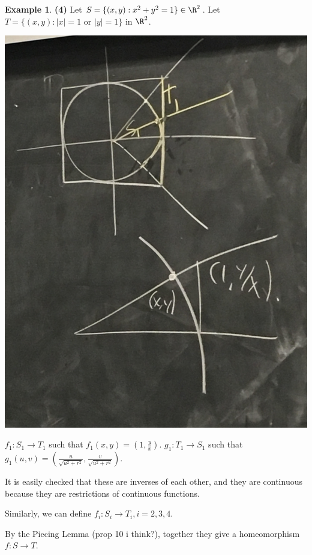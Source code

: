 \documentclass[a5paper]{article}
\theoremstyle{definition}%
\newtheorem*{example*}{Example}
\numberwithin{exercise}{section}
\theoremstyle{remark}%
\begin{document}
\begin{example*}\textbf{(4)}
Let $S=\{(x,y):x^2+y^2=1\}\in\R^2$. Let $T=\{(x,y):|x|=1\text{ or } |y|=1\}$ in $\R^2$. 

\begin{center}
\includegraphics[scale=.04]{images/s_t_figs}
\end{center}

$f_1:S_1\to T_1$ such that $f_1(x,y)=(1,\frac{y}{x})$. 
$g_1:T_1\to S_1$ such that $g_1(u,v)=(\frac{u}{\sqrt{u^2+r^2}},\frac{v}{\sqrt{u^2+r^2}})$.

It is easily checked that these are inverses of each other, and they are continuous because they are restrictions of continuous functions. 

Similarly, we can define $f_i:S_i\to T_i, i=2,3,4$. 

By the Piecing Lemma (prop 10 i think?), together they give a homeomorphism $f:S\to T$. 
\end{example*}
\end{document}
